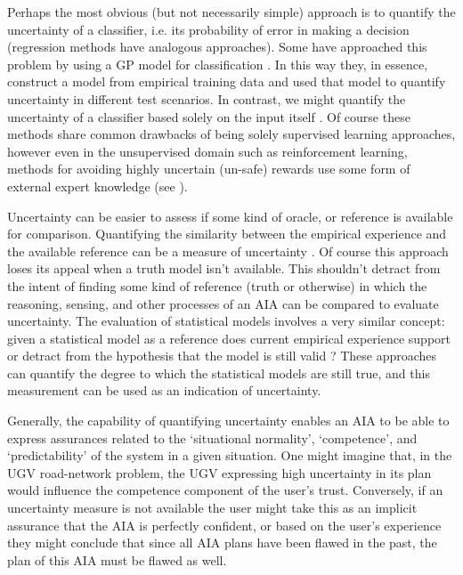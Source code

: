     Perhaps the most obvious (but not necessarily simple) approach is to quantify the uncertainty of a classifier, i.e. its probability of error in making a decision (regression methods have analogous approaches). Some have approached this problem by using a GP model for classification \cite{Gurau2016-hs}. In this way they, in essence, construct a model from empirical training data and used that model to quantify uncertainty in different test scenarios. In contrast, we might quantify the uncertainty of a classifier based solely on the input itself \cite{Zhang2014-he}. Of course these methods share common drawbacks of being solely supervised learning approaches, however even in the unsupervised domain such as reinforcement learning, methods for avoiding highly uncertain (un-safe) rewards use some form of external expert knowledge (see \cite{Garcia2015-rs, Lipton2016-dq}). 

    Uncertainty can be easier to assess if some kind of oracle, or reference is available for comparison. Quantifying the similarity between the empirical experience and the available reference can be a measure of uncertainty \cite{Kaipa2015-hy}. Of course this approach loses its appeal when a truth model isn't available. This shouldn't detract from the intent of finding some kind of reference (truth or otherwise) in which the reasoning, sensing, and other processes of an AIA can be compared to evaluate uncertainty. The evaluation of statistical models involves a very similar concept: given a statistical model as a reference does current empirical experience support or detract from the hypothesis that the model is still valid \cite{Laskey1995-jp,Ghosh2016-dl}? These approaches can quantify the degree to which the statistical models are still true, and this measurement can be used as an indication of uncertainty.

    Generally, the capability of quantifying uncertainty enables an AIA to be able to express assurances related to the `situational normality', `competence', and `predictability' of the system in a given situation. One might imagine that, in the UGV road-network problem, the UGV expressing high uncertainty in its plan would influence the competence component of the user's trust. Conversely, if an uncertainty measure is not available the user might take this as an implicit assurance that the AIA is perfectly confident, or based on the user's experience they might conclude that since all AIA plans have been flawed in the past, the plan of this AIA must be flawed as well.

